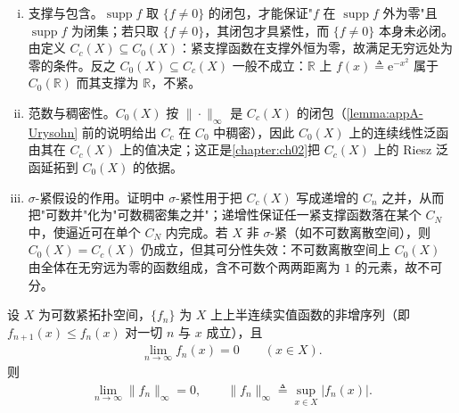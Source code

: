 \documentclass[../main.tex]{subfiles}
\begin{document}
\begin{remark}\label{remark:appA-Cc与C0}
\begin{enumerate}[(i)]
\item 支撑与包含。$\operatorname{supp}f$ 取 $\{f\neq0\}$ 的闭包，才能保证"$f$ 在 $\operatorname{supp}f$ 外为零"且 $\operatorname{supp}f$ 为闭集；若只取 $\{f\neq0\}$，其闭包才具紧性，而 $\{f\neq0\}$ 本身未必闭。由定义 $C_c(X)\subseteq C_0(X)$：紧支撑函数在支撑外恒为零，故满足无穷远处为零的条件。反之 $C_0(X)\subseteq C_c(X)$ 一般不成立：$\mathbb{R}$ 上 $f(x)\triangleq\mathrm{e}^{-x^2}$ 属于 $C_0(\mathbb{R})$ 而其支撑为 $\mathbb{R}$，不紧。
\item 范数与稠密性。$C_0(X)$ 按 $\|\cdot\|_\infty$ 是 $C_c(X)$ 的闭包（\cref{lemma:appA-Urysohn} 前的说明给出 $C_c$ 在 $C_0$ 中稠密），因此 $C_0(X)$ 上的连续线性泛函由其在 $C_c(X)$ 上的值决定；这正是\cref{chapter:ch02}把 $C_c(X)$ 上的 Riesz 泛函延拓到 $C_0(X)$ 的依据。
\item $\sigma$-紧假设的作用。证明中 $\sigma$-紧性用于把 $C_c(X)$ 写成递增的 $C_n$ 之并，从而把"可数并"化为"可数稠密集之并"；递增性保证任一紧支撑函数落在某个 $C_N$ 中，使逼近可在单个 $C_N$ 内完成。若 $X$ 非 $\sigma$-紧（如不可数离散空间），则 $C_0(X)=C_c(X)$ 仍成立，但其可分性失效：不可数离散空间上 $C_0(X)$ 由全体在无穷远为零的函数组成，含不可数个两两距离为 $1$ 的元素，故不可分。
\end{enumerate}
\end{remark}

\begin{proposition}[Dini 定理]\label{proposition:appA-Dini}
设 $X$ 为可数紧拓扑空间，$\{f_n\}$ 为 $X$ 上上半连续实值函数的非增序列（即 $f_{n+1}(x)\leqslant f_n(x)$ 对一切 $n$ 与 $x$ 成立），且
\begin{align*}
\lim_{n\to\infty}f_n(x)=0\qquad(x\in X).
\end{align*}
则
\begin{align*}
\lim_{n\to\infty}\|f_n\|_\infty=0,\qquad \|f_n\|_\infty\triangleq\sup_{x\in X}|f_n(x)|.
\end{align*}
\end{proposition}
\end{document}
